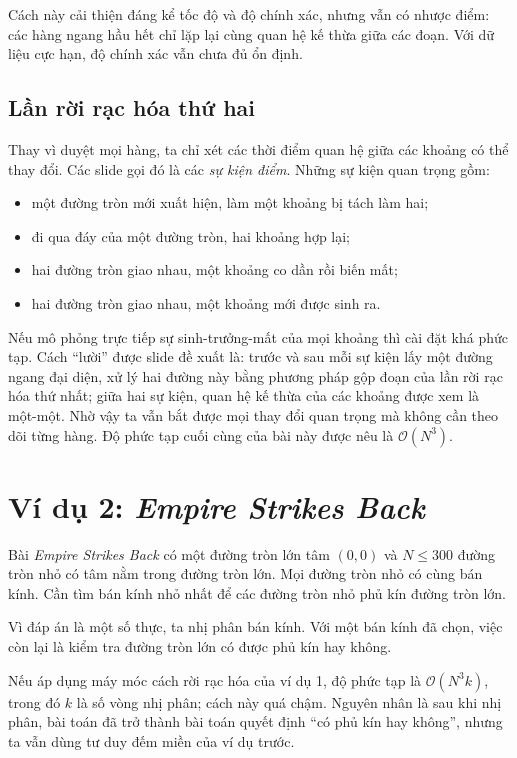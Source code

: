\documentclass[11pt]{article}
\newcommand{\Oh}{\mathcal{O}}
\begin{document}
Cách này cải thiện đáng kể tốc độ và độ chính xác, nhưng vẫn có nhược điểm:
các hàng ngang hầu hết chỉ lặp lại cùng quan hệ kế thừa giữa các đoạn. Với dữ
liệu cực hạn, độ chính xác vẫn chưa đủ ổn định.

\subsection{Lần rời rạc hóa thứ hai}

Thay vì duyệt mọi hàng, ta chỉ xét các thời điểm quan hệ giữa các khoảng có
thể thay đổi. Các slide gọi đó là các \emph{sự kiện điểm}. Những sự kiện quan
trọng gồm:
\begin{itemize}
  \item một đường tròn mới xuất hiện, làm một khoảng bị tách làm hai;
  \item đi qua đáy của một đường tròn, hai khoảng hợp lại;
  \item hai đường tròn giao nhau, một khoảng co dần rồi biến mất;
  \item hai đường tròn giao nhau, một khoảng mới được sinh ra.
\end{itemize}

Nếu mô phỏng trực tiếp sự sinh-trưởng-mất của mọi khoảng thì cài đặt khá phức
tạp. Cách ``lười'' được slide đề xuất là: trước và sau mỗi sự kiện lấy một
đường ngang đại diện, xử lý hai đường này bằng phương pháp gộp đoạn của lần
rời rạc hóa thứ nhất; giữa hai sự kiện, quan hệ kế thừa của các khoảng được
xem là một-một. Nhờ vậy ta vẫn bắt được mọi thay đổi quan trọng mà không cần
theo dõi từng hàng. Độ phức tạp cuối cùng của bài này được nêu là
\(\Oh(N^3)\).

\section{Ví dụ 2: \textit{Empire Strikes Back}}

Bài \textit{Empire Strikes Back} có một đường tròn lớn tâm \((0,0)\) và
\(N\le 300\) đường tròn nhỏ có tâm nằm trong đường tròn lớn. Mọi đường tròn
nhỏ có cùng bán kính. Cần tìm bán kính nhỏ nhất để các đường tròn nhỏ phủ kín
đường tròn lớn.

Vì đáp án là một số thực, ta nhị phân bán kính. Với một bán kính đã chọn, việc
còn lại là kiểm tra đường tròn lớn có được phủ kín hay không.

Nếu áp dụng máy móc cách rời rạc hóa của ví dụ 1, độ phức tạp là
\(\Oh(N^3k)\), trong đó \(k\) là số vòng nhị phân; cách này quá chậm. Nguyên
nhân là sau khi nhị phân, bài toán đã trở thành bài toán quyết định ``có phủ
kín hay không'', nhưng ta vẫn dùng tư duy đếm miền của ví dụ trước.
\end{document}
